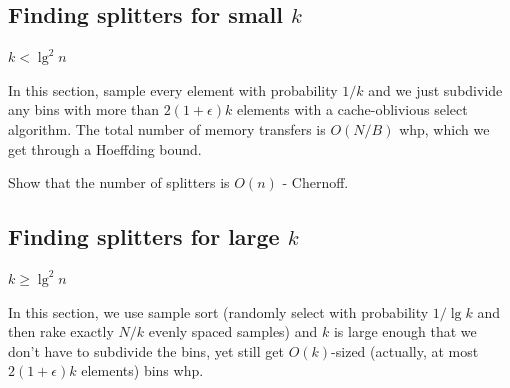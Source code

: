\subsection*{Finding splitters for small $k$}

$k < \lg^2 n$

In this section, sample every element with probability $1/k$ and we just subdivide any bins
with more than $2(1+\epsilon)k$ elements with a cache-oblivious select algorithm.
The total number of memory transfers is $O(N/B)$ whp, which we get through a Hoeffding
bound.

Show that the number of splitters is $O(n)$ - Chernoff.

\subsection*{Finding splitters for large $k$}

$k \geq \lg ^2 n$

In this section, we use sample sort (randomly select with probability $1/\lg k$ and
then rake exactly $N/k$ evenly spaced samples) and $k$ is large enough that we don't have
to subdivide the bins, yet still get $O(k)$-sized (actually, at most 
$2(1+\epsilon)k$ elements) bins whp.  



